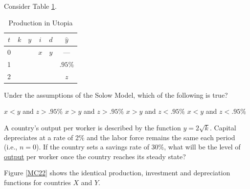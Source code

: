 \documentclass[addpoints,11pt]{exam}
\theoremstyle{definition}
\begin{document}
\begin{questions}
	
	\question Consider Table \ref{tab1}. 
	
	\begin{table}[h!]
		\centering
		\caption{Production in Utopia}
		\label{tab1}
		\begin{tabular}{c|c|c|c|c|c}        
			
			$t$ & $k$ & $y$ & $i$ & $d$ & $\hat{y}$ \\
			\hline
			0 &  &  & $x$ & $y$ & ---\\
			1 &  & & &  & $.95\%$ \\
			2 &  & & & & $z$\\
		\end{tabular}
	\end{table}
	
	Under the assumptions of the Solow Model, which of the following is true?
	
	\begin{choices}
		\choice $x<y$ and $z>.95\%$
		\choice $x>y$ and $z>.95\%$
		\CorrectChoice $x>y$ and $z<.95\%$
		\choice $x<y$ and $z<.95\%$
	\end{choices}

\question A country's output per worker is described by the function $y=2\sqrt{k}$. Capital depreciates at a rate of 2\% and the labor force remains the same each period (i.e., $n =0$). If the country sets a savings rate of 30\%, what will be the level of \underline{output} per worker once the country reaches its steady state?

\begin{choices}
	\choice 900
	\choice 45
	\CorrectChoice 60 
	\choice 30
\end{choices}


\newpage



	\question Figure \ref{MC22} shows the identical production, investment and depreciation functions for countries $X$ and $Y$. 



\end{questions}
\end{document}

